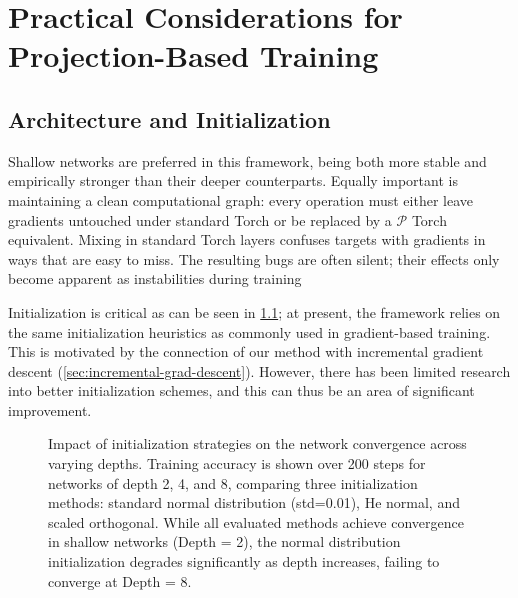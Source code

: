 \chapter{Practical Considerations for Projection-Based Training}
\section{Architecture and Initialization}
\label{sec:arch-init}
Shallow networks are preferred in this framework, being both more stable and empirically stronger than their deeper counterparts. Equally important is maintaining a clean computational graph: every operation must either leave gradients untouched under standard Torch or be replaced by a $\mathcal{P}$
Torch equivalent. Mixing in standard Torch layers confuses targets with gradients in ways that are easy to miss. The resulting bugs are often silent; their effects only become apparent as instabilities during training

Initialization is critical as can be seen in \cref{fig:effect-of-init}; at present, the framework relies on the same initialization heuristics as commonly used in gradient-based training. This is motivated by the connection of our method with incremental gradient descent (\cref{sec:incremental-grad-descent}). However, there has been limited research into better initialization schemes, and this can thus be an area of significant improvement.

\begin{figure}[ht]
\centering
{}
\caption{Impact of initialization strategies on the network convergence across varying depths. Training accuracy is shown over 200 steps for networks of depth 2, 4, and 8, comparing three initialization methods: standard normal distribution (std=0.01), He normal, and scaled orthogonal. While all evaluated methods achieve convergence in shallow networks (Depth = 2), the normal distribution initialization degrades significantly as depth increases, failing to converge at Depth = 8.}
\label{fig:effect-of-init}
\end{figure}
\newpage

